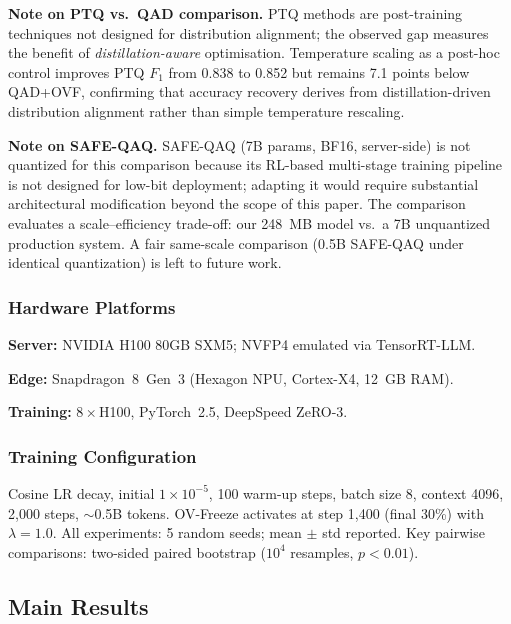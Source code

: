 \documentclass[lettersize,journal]{IEEEtran}
\begin{document}
\textbf{Note on PTQ vs.\ QAD comparison.}  PTQ methods are
post-training techniques not designed for distribution alignment; the
observed gap measures the benefit of \emph{distillation-aware}
optimisation.  Temperature scaling as a post-hoc control improves PTQ
$F_1$ from 0.838 to 0.852 but remains 7.1 points below QAD+OVF,
confirming that accuracy recovery derives from distillation-driven
distribution alignment rather than simple temperature rescaling.

\textbf{Note on SAFE-QAQ.} SAFE-QAQ (7B params, BF16, server-side)
is not quantized for this comparison because its RL-based multi-stage
training pipeline is not designed for low-bit deployment; adapting it
would require substantial architectural modification beyond the scope
of this paper.  The comparison evaluates a scale--efficiency
trade-off: our 248~MB model vs.\ a 7B unquantized production system.
A fair same-scale comparison (0.5B SAFE-QAQ under identical
quantization) is left to future work.

\subsubsection{Hardware Platforms}

\textbf{Server:} NVIDIA H100 80GB SXM5; NVFP4 emulated via
TensorRT-LLM.

\textbf{Edge:} Snapdragon~8~Gen~3 (Hexagon NPU, Cortex-X4, 12~GB RAM).

\textbf{Training:} $8\times$H100, PyTorch~2.5, DeepSpeed ZeRO-3.

\subsubsection{Training Configuration}

Cosine LR decay, initial $1\times10^{-5}$, 100 warm-up steps, batch
size 8, context 4096, 2,000 steps, $\sim$0.5B tokens.  OV-Freeze
activates at step 1,400 (final 30\%) with $\lambda=1.0$.  All
experiments: 5 random seeds; mean $\pm$ std reported.  Key pairwise
comparisons: two-sided paired bootstrap ($10^4$ resamples, $p<0.01$).

\subsection{Main Results}
\label{sec:main_results}
\end{document}
